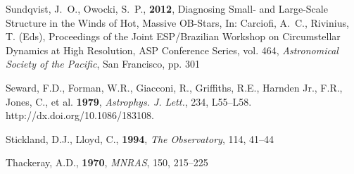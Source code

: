 \documentclass[USenglish,twocolumn]{article}
\begin{document}
\begin{thebibliography}{}
 Sundqvist, J.~O., Owocki, S.~P., \textbf{2012}, Diagnosing Small- and Large-Scale Structure in the Winds of Hot, Massive OB-Stars, In: Carciofi, A.~C., Rivinius, T. (Eds), Proceedings of the Joint ESP/Brazilian Workshop on Circumstellar Dynamics at High Resolution, ASP Conference Series, vol. 464, \textit{Astronomical Society of the Pacific}, San Francisco, pp. 301

Seward, F.D., Forman, W.R., Giacconi, R., Griffiths, R.E., Harnden Jr., F.R., Jones, C., et al. \textbf{1979}, \textit{Astrophys. J. Lett.}, 234, L55–L58. http://dx.doi.org/10.1086/183108.

Stickland, D.J., Lloyd, C., \textbf{1994}, \textit{The Observatory}, 114, 41–44

Thackeray, A.D., \textbf{1970}, \textit{MNRAS}, 150, 215–225

\end{thebibliography}{} 
\end{document}
